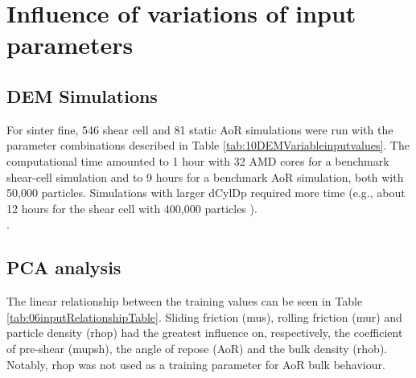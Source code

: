
\chapter{Influence of variations of input parameters}
\label{cap:influence}

\section{DEM Simulations}
\label{sec:simulations}

For sinter fine, 546 shear cell and 81 static \acs{AoR} simulations 
were run with
the parameter combinations described in Table
\ref{tab:10DEMVariableinputvalues}.
The computational time amounted to 1 hour with 32 AMD cores for a benchmark
shear-cell simulation and to 9 hours for a benchmark \acs{AoR} simulation, both with
50,000 particles.
Simulations with larger \acs{dCylDp} required more time (e.g., about 12 hours for
the shear cell with 400,000 particles ). \\

.


\section{PCA analysis}
\label{sec:pcaanalysis}

The linear relationship between the
training values can be seen in Table \ref{tab:06inputRelationshipTable}.
Sliding friction (\acs{mus}), rolling friction (\acs{mur}) and particle density (\acs{rhop})
had the greatest influence on, respectively, the coefficient of pre-shear
(\acs{mupsh}), the angle of repose  (\acs{AoR}) and the bulk density (\acs{rhob}). Notably, \acs{rhop}
was not used as a training parameter for \acs{AoR} bulk behaviour. 

